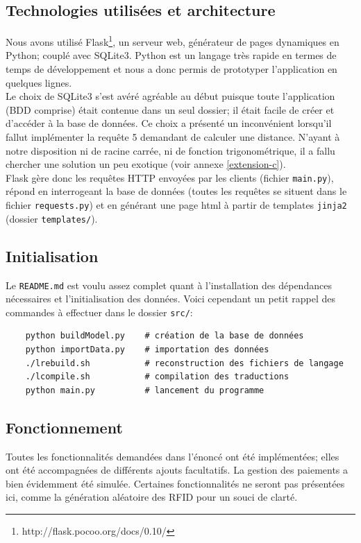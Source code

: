 \documentclass[a4paper]{article}
\begin{document}
    \subsection{Technologies utilisées et architecture}
    Nous avons utilisé Flask\footnote{http://flask.pocoo.org/docs/0.10/}, un serveur web, générateur de pages dynamiques en Python; couplé avec SQLite3. Python est un langage très rapide en termes de temps de développement et nous a donc permis de prototyper l'application en quelques lignes.\\
    
    Le choix de SQLite3 s'est avéré agréable au début puisque toute l'application (BDD comprise) était contenue dans un seul dossier; il était facile de créer et d'accéder à la base de données. Ce choix a présenté un inconvénient lorsqu'il fallut implémenter la requête 5 demandant de calculer une distance. N'ayant à notre disposition ni de racine carrée, ni de fonction trigonométrique, il a fallu chercher une solution un peu exotique (voir annexe \ref{extension-c}).\\
    
    Flask gère donc les requêtes HTTP envoyées par les clients (fichier \texttt{main.py}), répond en interrogeant la base de données (toutes les requêtes se situent dans le fichier \texttt{requests.py}) et en générant une page html à partir de templates \texttt{jinja2} (dossier \texttt{templates/}).
    
    \subsection{Initialisation}
    Le \texttt{README.md} est voulu assez complet quant à l'installation des dépendances nécessaires et l'initialisation des données. Voici cependant un petit rappel des commandes à effectuer dans le dossier \texttt{src/}:
    
    \begin{verbatim}
    python buildModel.py    # création de la base de données
    python importData.py    # importation des données
    ./lrebuild.sh           # reconstruction des fichiers de langage
    ./lcompile.sh           # compilation des traductions
    python main.py          # lancement du programme
    \end{verbatim}
    
    \subsection{Fonctionnement}
    Toutes les fonctionnalités demandées dans l'énoncé ont été implémentées; elles ont été accompagnées de différents ajouts facultatifs. La gestion des paiements a bien évidemment été simulée. Certaines fonctionnalités ne seront pas présentées ici, comme la génération aléatoire des RFID pour un souci de clarté.
    
\end{document}
